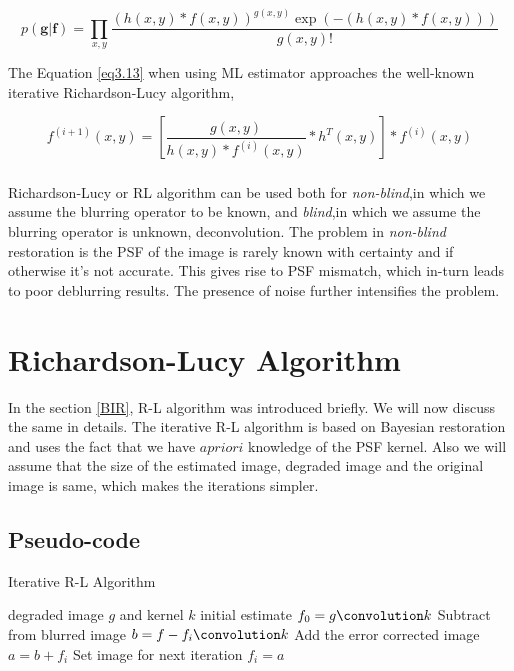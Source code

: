 \documentclass[a4paper]{book}
\begin{document}
\begin{equation}
	\label{eq3.13}
	p(\textbf{g}|\textbf{f}) = \prod_{x,y}\frac{\left(h(x,y)*f(x,y)\right)^{g(x,y)}\exp \left(-(h(x,y)*f(x,y))\right)}{g(x,y)!}
\end{equation}

%
The Equation \ref{eq3.13} when using ML estimator approaches the well-known iterative Richardson-Lucy algorithm\cite{Richardson72RL}\cite{Lucy74RL},

\begin{equation}
	\label{eq3.14}
	f^{(i+1)}(x,y) = \left[\frac{g(x,y)}{h(x,y)*f^{(i)}(x,y)}*h^T(x,y)\right]*f^{(i)}(x,y)
\end{equation}
\paragraph*{} Richardson-Lucy or RL algorithm can be used both for \textit{non-blind},in which we assume the blurring operator to be known, and \textit{blind},in which we assume the blurring operator is unknown, deconvolution. The problem in \textit{non-blind} restoration is the PSF of the image is rarely known with certainty and if otherwise it's not accurate. This gives rise to PSF mismatch, which in-turn leads to poor deblurring results. The presence of noise further intensifies the problem.\cite{almeida2010blind}


\chapter[\LARGE Richardson-Lucy Algorithm]{Richardson-Lucy Algorithm}\label{chapRL}
\thispagestyle{empty}
In the section \ref{BIR}, R-L algorithm was introduced briefly. We will now discuss the same in details. The iterative R-L algorithm is based on Bayesian restoration and uses the fact that we have $ a priori $ knowledge of the PSF kernel. Also we will assume that the size of the estimated image, degraded image and the original image is same, which makes the iterations simpler.
\section{\Large Pseudo-code}\label{secPseudo}
\begin{algorithm}
	\caption{Iterative R-L Algorithm}
	\label{alg4}
	\begin{algorithmic}
		\STATE degraded image $ g $ and kernel $ k $
		\STATE initial estimate $ f_0 = g \convolution k $
			\STATE Subtract from blurred image $b = f - f_i \convolution k $
			\STATE Add the error corrected image $ a = b + f_i $
			\STATE Set image for next iteration $ f_i = a $
		\ENDFOR
	\end{algorithmic}
\end{algorithm}
\newpage
\end{document}
